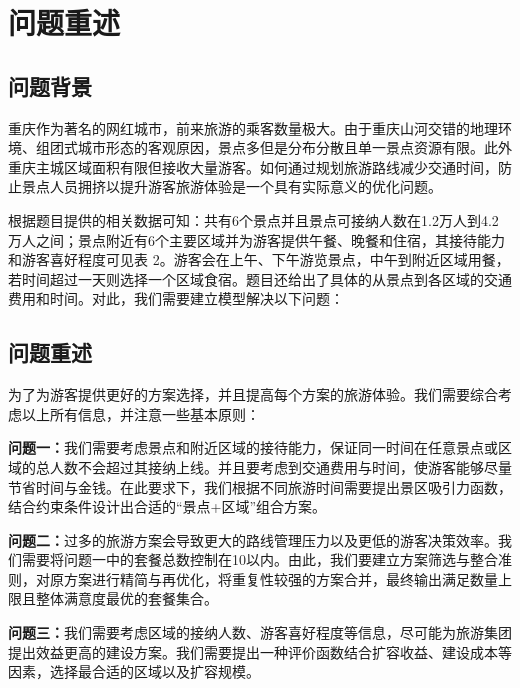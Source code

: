 \chapter[\hspace{0pt}问题重述]{{\heiti{}\hspace{0pt}问题重述}}\label{chapter1: 问题重述}
\removelofgap
\removelotgap
\setcounter{page}{2}  %

\section[\hspace{-2pt}问题背景]{{\heiti{} \hspace{-8pt}问题背景}}\label{section1: 问题背景}

重庆作为著名的网红城市，前来旅游的乘客数量极大。由于重庆山河交错的地理环境、组团式城市形态的客观原因，景点多但是分布分散且单一景点资源有限。此外重庆主城区域面积有限但接收大量游客。如何通过规划旅游路线减少交通时间，防止景点人员拥挤以提升游客旅游体验是一个具有实际意义的优化问题。

根据题目提供的相关数据可知：共有6个景点并且景点可接纳人数在1.2万人到4.2万人之间；景点附近有6个主要区域并为游客提供午餐、晚餐和住宿，其接待能力和游客喜好程度可见表 2。游客会在上午、下午游览景点，中午到附近区域用餐，若时间超过一天则选择一个区域食宿。题目还给出了具体的从景点到各区域的交通费用和时间。对此，我们需要建立模型解决以下问题：

\section[\hspace{-2pt}问题重述]{{\heiti{} \hspace{-8pt}问题重述}}\label{section1: 问题重述}

为了为游客提供更好的方案选择，并且提高每个方案的旅游体验。我们需要综合考虑以上所有信息，并注意一些基本原则：

\textbf{问题一：}我们需要考虑景点和附近区域的接待能力，保证同一时间在任意景点或区域的总人数不会超过其接纳上线。并且要考虑到交通费用与时间，使游客能够尽量节省时间与金钱。在此要求下，我们根据不同旅游时间需要提出景区吸引力函数，结合约束条件设计出合适的“景点+区域”组合方案。


\textbf{问题二：}过多的旅游方案会导致更大的路线管理压力以及更低的游客决策效率。我们需要将问题一中的套餐总数控制在10以内。由此，我们要建立方案筛选与整合准则，对原方案进行精简与再优化，将重复性较强的方案合并，最终输出满足数量上限且整体满意度最优的套餐集合。

\textbf{问题三：}我们需要考虑区域的接纳人数、游客喜好程度等信息，尽可能为旅游集团提出效益更高的建设方案。我们需要提出一种评价函数结合扩容收益、建设成本等因素，选择最合适的区域以及扩容规模。

